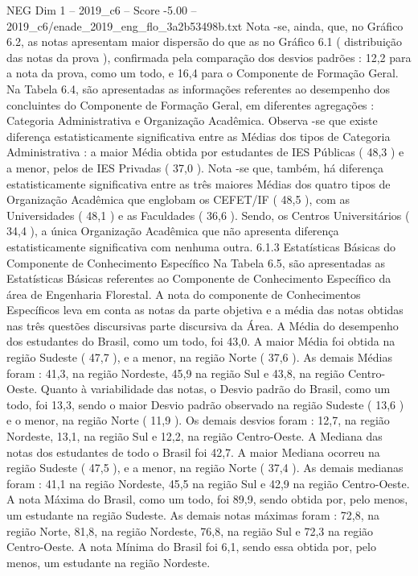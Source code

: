 \begin{textsample}{NEG Dim 1 – 2019\_c6 – Score -5.00 – 2019\_c6/enade\_2019\_eng\_flo\_3a2b53498b.txt}
Nota -se, ainda, que, no Gráfico 6.2, as notas apresentam maior dispersão do que as no Gráfico 6.1 ( distribuição das notas da prova ), confirmada pela comparação dos desvios padrões : 12,2 para a nota da prova, como um todo, e 16,4 para o Componente de Formação Geral.
Na Tabela 6.4, são apresentadas as informações referentes ao desempenho dos concluintes do Componente de Formação Geral, em diferentes agregações : Categoria Administrativa e Organização Acadêmica.
Observa -se que existe diferença estatisticamente significativa entre as Médias dos tipos de Categoria Administrativa : a maior Média obtida por estudantes de IES Públicas ( 48,3 ) e a menor, pelos de IES Privadas ( 37,0 ).
Nota -se que, também, há diferença estatisticamente significativa entre as três maiores Médias dos quatro tipos de Organização Acadêmica que englobam os CEFET/IF ( 48,5 ), com as Universidades ( 48,1 ) e as Faculdades ( 36,6 ).
Sendo, os Centros Universitários ( 34,4 ), a única Organização Acadêmica que não apresenta diferença estatisticamente significativa com nenhuma outra. 6.1.3 Estatísticas Básicas do Componente de Conhecimento Específico Na Tabela 6.5, são apresentadas as Estatísticas Básicas referentes ao Componente de Conhecimento Específico da área de Engenharia Florestal.
A nota do componente de Conhecimentos Específicos leva em conta as notas da parte objetiva e a média das notas obtidas nas três questões discursivas parte discursiva da Área.
A Média do desempenho dos estudantes do Brasil, como um todo, foi 43,0.
A maior Média foi obtida na região Sudeste ( 47,7 ), e a menor, na região Norte ( 37,6 ).
As demais Médias foram : 41,3, na região Nordeste, 45,9 na região Sul e 43,8, na região Centro-Oeste.
Quanto à variabilidade das notas, o Desvio padrão do Brasil, como um todo, foi 13,3, sendo o maior Desvio padrão observado na região Sudeste ( 13,6 ) e o menor, na região Norte ( 11,9 ).
Os demais desvios foram : 12,7, na região Nordeste, 13,1, na região Sul e 12,2, na região Centro-Oeste.
A Mediana das notas dos estudantes de todo o Brasil foi 42,7.
A maior Mediana ocorreu na região Sudeste ( 47,5 ), e a menor, na região Norte ( 37,4 ).
As demais medianas foram : 41,1 na região Nordeste, 45,5 na região Sul e 42,9 na região Centro-Oeste.
A nota Máxima do Brasil, como um todo, foi 89,9, sendo obtida por, pelo menos, um estudante na região Sudeste.
As demais notas máximas foram : 72,8, na região Norte, 81,8, na região Nordeste, 76,8, na região Sul e 72,3 na região Centro-Oeste.
A nota Mínima do Brasil foi 6,1, sendo essa obtida por, pelo menos, um estudante na região Nordeste.

\end{textsample}
